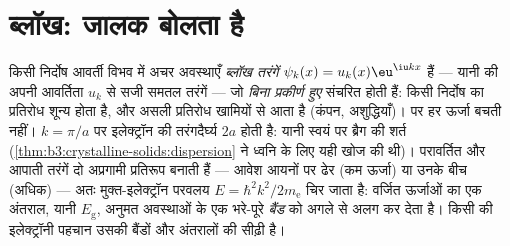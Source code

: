 \section{ब्लॉख: जालक बोलता है}

\begin{theorem}[ब्लॉख अवस्थाएँ और बैंड अंतराल]\label{thm:b3:electrons-in-solids:bloch}
किसी निर्दोष आवर्ती विभव में अचर अवस्थाएँ
\emph{ब्लॉख तरंगें} $\psi_k(x) = u_k(x)\eu^{\iu kx}$ हैं ---
यानी  की अपनी आवर्तिता $u_k$ से सजी समतल तरंगें ---
जो \emph{बिना प्रकीर्ण हुए} संचरित होती हैं: किसी निर्दोष  का
प्रतिरोध शून्य होता है, और असली प्रतिरोध खामियों से आता है
(कंपन, अशुद्धियाँ)। पर हर ऊर्जा बचती नहीं। $k = \pi/a$ पर
इलेक्ट्रॉन की तरंगदैर्घ्य $2a$ होती है: यानी स्वयं  पर ब्रैग की
शर्त (\cref{thm:b3:crystalline-solids:dispersion} ने ध्वनि के लिए
यही खोज की थी)। परावर्तित और आपाती तरंगें दो अप्रगामी प्रतिरूप बनाती
हैं --- आवेश आयनों पर ढेर (कम ऊर्जा) या उनके बीच (अधिक) --- अतः
मुक्त-इलेक्ट्रॉन परवलय $E = \hbar^2k^2/2m_{\text{e}}$ चिर जाता है:
वर्जित ऊर्जाओं का एक अंतराल, यानी \emph{} $E_{\text{g}}$,
अनुमत अवस्थाओं के एक भरे-पूरे \emph{बैंड} को अगले से अलग कर देता है।
किसी  की इलेक्ट्रॉनी पहचान उसकी बैंडों और अंतरालों की सीढ़ी है।
\end{theorem}
\admitted

